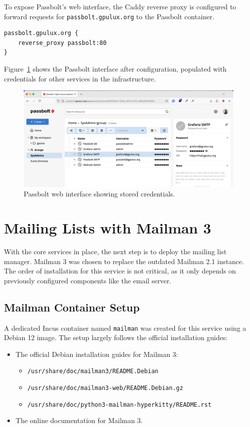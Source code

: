 To expose Passbolt's web interface, the Caddy reverse proxy is configured to forward requests for \texttt{passbolt.gpulux.org} to the Passbolt container.

\begin{lstlisting}[caption={Caddyfile configuration to reverse proxy Passbolt.}]
passbolt.gpulux.org {
    reverse_proxy passbolt:80
}
\end{lstlisting}

Figure~\ref{fig:passbolt-ui} shows the Passbolt interface after configuration, populated with credentials for other services in the infrastructure.

\begin{figure}[H]
	\centering
	\includegraphics[width=\textwidth]{imaxes/passbolt-gpulux.png}
	\caption{Passbolt web interface showing stored credentials.}
	\label{fig:passbolt-ui}
\end{figure}

\section{Mailing Lists with Mailman 3}
\label{sec:mailman}

With the core services in place, the next step is to deploy the mailing list manager. Mailman 3 was chosen to replace the outdated Mailman 2.1 instance. The order of installation for this service is not critical, as it only depends on previously configured components like the email server.

\subsection*{Mailman Container Setup}

A dedicated Incus container named \texttt{mailman} was created for this service using a Debian 12 image. The setup largely follows the official installation guides:
\begin{itemize}
    \item The official Debian installation guides for Mailman 3:
    \begin{itemize}
        \item \texttt{/usr/share/doc/mailman3/README.Debian}
        \item \texttt{/usr/share/doc/mailman3-web/README.Debian.gz}
        \item \texttt{/usr/share/doc/python3-mailman-hyperkitty/README.rst}
    \end{itemize}
    \item The online documentation for Mailman 3\cite{mailman3-docs}.
\end{itemize}

